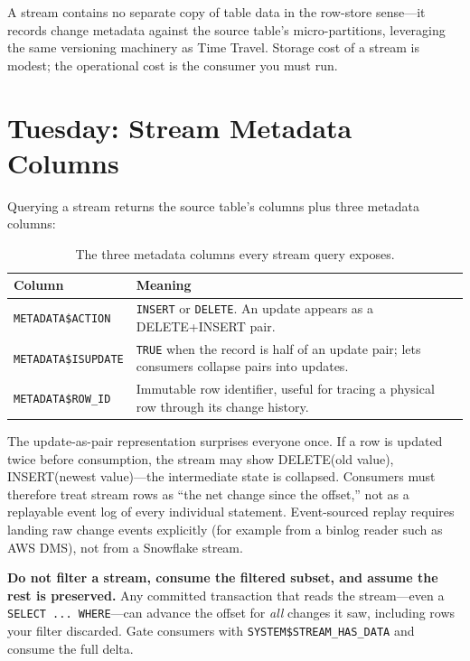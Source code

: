 \begin{notebox}
A stream contains no separate copy of table data in the row-store sense---it records change metadata against the source table's micro-partitions, leveraging the same versioning machinery as Time Travel. Storage cost of a stream is modest; the operational cost is the consumer you must run.
\end{notebox}

\section{Tuesday: Stream Metadata Columns}
Querying a stream returns the source table's columns plus three metadata columns:

\begin{table}[H]
\centering
\small
\begin{tabular}{@{}p{4.2cm}p{9.2cm}@{}}
\toprule
\textbf{Column} & \textbf{Meaning} \\
\midrule
\texttt{METADATA\$ACTION} & \texttt{INSERT} or \texttt{DELETE}. An update appears as a DELETE+INSERT pair. \\
\texttt{METADATA\$ISUPDATE} & \texttt{TRUE} when the record is half of an update pair; lets consumers collapse pairs into updates. \\
\texttt{METADATA\$ROW\_ID} & Immutable row identifier, useful for tracing a physical row through its change history. \\
\bottomrule
\end{tabular}
\caption{The three metadata columns every stream query exposes.}
\label{tab:chapter7-stream-metadata}
\end{table}

The update-as-pair representation surprises everyone once. If a row is updated twice before consumption, the stream may show DELETE(old value), INSERT(newest value)---the intermediate state is collapsed. Consumers must therefore treat stream rows as ``the net change since the offset,'' not as a replayable event log of every individual statement. Event-sourced replay requires landing raw change events explicitly (for example from a binlog reader such as AWS DMS), not from a Snowflake stream.

\begin{pitfall}
\textbf{Do not filter a stream, consume the filtered subset, and assume the rest is preserved.} Any committed transaction that reads the stream---even a \texttt{SELECT ... WHERE}---can advance the offset for \emph{all} changes it saw, including rows your filter discarded. Gate consumers with \texttt{SYSTEM\$STREAM\_HAS\_DATA} and consume the full delta.
\end{pitfall}

